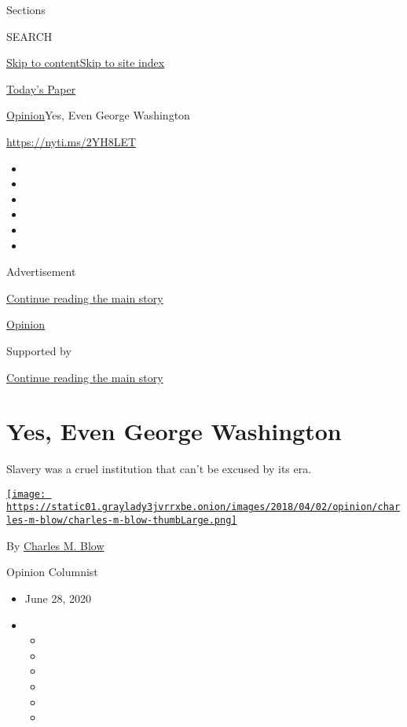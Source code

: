 Sections

SEARCH

\protect\hyperlink{site-content}{Skip to
content}\protect\hyperlink{site-index}{Skip to site index}

\href{https://myaccount.nytimes3xbfgragh.onion/auth/login?response_type=cookie\&client_id=vi}{}

\href{https://www.nytimes3xbfgragh.onion/section/todayspaper}{Today's
Paper}

\href{/section/opinion}{Opinion}\textbar{}Yes, Even George Washington

\url{https://nyti.ms/2YH8LET}

\begin{itemize}
\item
\item
\item
\item
\item
\item
\end{itemize}

Advertisement

\protect\hyperlink{after-top}{Continue reading the main story}

\href{/section/opinion}{Opinion}

Supported by

\protect\hyperlink{after-sponsor}{Continue reading the main story}

\hypertarget{yes-even-george-washington}{%
\section{Yes, Even George Washington}\label{yes-even-george-washington}}

Slavery was a cruel institution that can't be excused by its era.

\href{https://www.nytimes3xbfgragh.onion/by/charles-m-blow}{\texttt{[image: https://static01.graylady3jvrrxbe.onion/images/2018/04/02/opinion/charles-m-blow/charles-m-blow-thumbLarge.png]}}

By \href{https://www.nytimes3xbfgragh.onion/by/charles-m-blow}{Charles
M. Blow}

Opinion Columnist

\begin{itemize}
\item
  June 28, 2020
\item
  \begin{itemize}
  \item
  \item
  \item
  \item
  \item
  \item
  \end{itemize}
\end{itemize}

